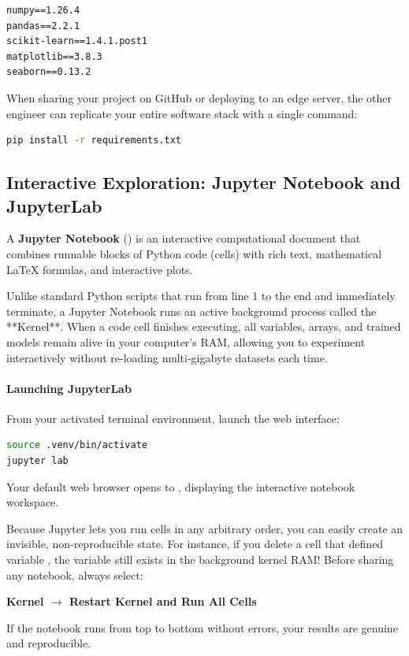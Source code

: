 \begin{lstlisting}[style=outputstyle]
numpy==1.26.4
pandas==2.2.1
scikit-learn==1.4.1.post1
matplotlib==3.8.3
seaborn==0.13.2
\end{lstlisting}

When sharing your project on GitHub or deploying to an edge server, the other engineer can replicate your entire software stack with a single command:
\begin{lstlisting}[language=bash]
pip install -r requirements.txt
\end{lstlisting}

\subsection{Interactive Exploration: Jupyter Notebook and JupyterLab}

\begin{keyidea}
A \textbf{Jupyter Notebook} () is an interactive computational document that combines runnable blocks of Python code (cells) with rich text, mathematical LaTeX formulas, and interactive plots.
\end{keyidea}

Unlike standard Python scripts that run from line 1 to the end and immediately terminate, a Jupyter Notebook runs an active background process called the **Kernel**. When a code cell finishes executing, all variables, arrays, and trained models remain alive in your computer's RAM, allowing you to experiment interactively without re-loading multi-gigabyte datasets each time.

\paragraph{Launching JupyterLab}
From your activated terminal environment, launch the web interface:
\begin{lstlisting}[language=bash]
source .venv/bin/activate
jupyter lab
\end{lstlisting}
Your default web browser opens to , displaying the interactive notebook workspace.

\begin{warning}
Because Jupyter lets you run cells in any arbitrary order, you can easily create an invisible, non-reproducible state. For instance, if you delete a cell that defined variable , the variable  still exists in the background kernel RAM! Before sharing any notebook, always select:
\begin{center}
\textbf{Kernel $\to$ Restart Kernel and Run All Cells}
\end{center}
If the notebook runs from top to bottom without errors, your results are genuine and reproducible.
\end{warning}

